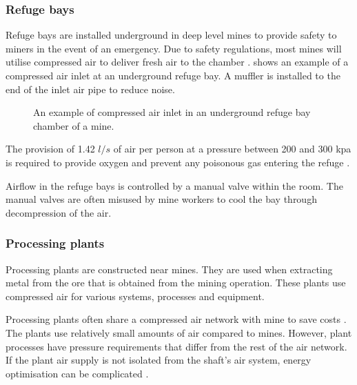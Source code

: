 \subsubsection{Refuge bays}
Refuge bays are installed underground in deep level mines to provide safety to miners in the event of an emergency. Due to safety regulations, most mines will utilise compressed air to deliver fresh air to the chamber \cite{brake1999criteria}.  shows an example of a compressed air inlet at an underground refuge bay. A muffler is installed to the end of the inlet air pipe to reduce noise.
\begin{figure}[!htbp]
	\centering
	\caption{An example of compressed air inlet in an underground refuge bay chamber of a mine.}
	\label{fig: Refuge Bay}
\end{figure}
\par The provision of 1.42 $l/s$ of air per person at a pressure between 200 and 300 \gls{kpa} is required to provide oxygen and prevent any poisonous gas entering the refuge \cite{brake1999criteria}.
\par
Airflow in the refuge bays is controlled by a manual valve within the room. The manual valves are often misused by mine workers to cool the bay through decompression of the air. %
\subsubsection{Processing plants}
Processing plants are constructed near mines. They are used when extracting metal from the ore that is obtained from the mining operation.  These plants use compressed air for various systems, processes and equipment. 
\par 
Processing plants often share a compressed air network with mine to save costs \cite{Marais2012PhD}. The plants use relatively small amounts of air compared to mines. However, plant processes have pressure requirements that differ from the rest of the air network. If the plant air supply is not isolated from the shaft's air system, energy optimisation can be complicated \cite{Kriel2014Masters}. 
